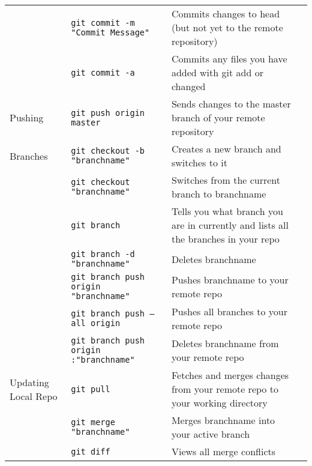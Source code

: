 \documentclass[11pt, letterpaper]{article}
\begin{document}
\begin{table}[!htb]
\begin{center}
\begin{tabular}{p{2cm} l p{4cm} l}
					& \texttt{git commit -m "Commit Message"} & Commits changes to head (but not yet to the remote repository) \\\cmidrule{2-3}

					& \texttt{git commit -a} & Commits any files you have added with git add or changed \\

					\midrule
					Pushing

					& \texttt{git push origin master} & Sends changes to the master branch of your remote repository \\

					\midrule
					Branches

					& \texttt{git checkout -b "branchname"} & Creates a new branch and switches to it \\\cmidrule{2-3}

					& \texttt{git checkout "branchname"} & Switches from the current branch to branchname \\\cmidrule{2-3}

					& \texttt{git branch} & Tells you what branch you are in currently and lists all the branches in your repo \\\cmidrule{2-3}

					& \texttt{git branch -d "branchname"} & Deletes branchname \\\cmidrule{2-3}

					& \texttt{git branch push origin "branchname"} & Pushes branchname to your remote repo \\\cmidrule{2-3}

					& \texttt{git branch push --all origin} & Pushes all branches to your remote repo \\\cmidrule{2-3}

					& \texttt{git branch push origin :"branchname"} & Deletes branchname from your remote repo \\

					\midrule
					Updating Local Repo

					& \texttt{git pull} & Fetches and merges changes from your remote repo to your working directory \\\cmidrule{2-3}
					
					& \texttt{git merge "branchname"} & Merges branchname into your active branch \\\cmidrule{2-3}

					& \texttt{git diff} & Views all merge conflicts \\

					\bottomrule
				\end{tabular}
				\hspace*{-2cm}
			\end{center}
		\end{table}
\end{document}
